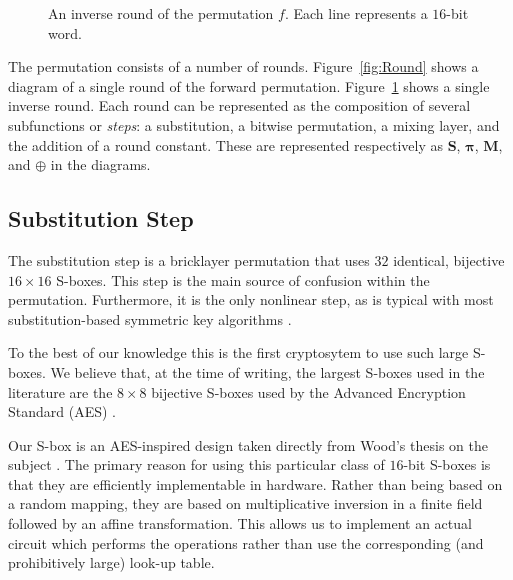 \begin{figure}[p,height=.8\textheight]
\centering

\caption{An inverse round of the permutation $f$. Each line represents a $16$-bit word.}
\label{fig:RoundInverse}
\end{figure}

The permutation consists of a number of rounds.
Figure~\ref{fig:Round} shows a diagram of a single round of the forward permutation.
Figure~\ref{fig:RoundInverse} shows a single inverse round.
Each round can be represented as the composition of several subfunctions or \emph{steps}: a substitution, a bitwise permutation, a mixing layer, and the addition of a round constant.
These are represented respectively as $\mathbf{S}$, $\mathbf{\pi}$, $\mathbf{M}$, and $\oplus$ in the diagrams.

\subsection{Substitution Step}
The substitution step is a bricklayer permutation that uses $32$ identical, bijective $16 \times 16$ S-boxes.
This step is the main source of confusion within the permutation.
Furthermore, it is the only nonlinear step, as is typical with most substitution-based symmetric key algorithms \cite{Stinson2006_CTAP}.

To the best of our knowledge this is the first cryptosytem to use such large S-boxes.
We believe that, at the time of writing, the largest S-boxes used in the literature are the $8 \times 8$ bijective S-boxes used by the Advanced Encryption Standard (AES) \cite{Daemen2002_DesignOfRijndael}\cite{NIST2001_FIPS-197}.

Our S-box is an AES-inspired design taken directly from Wood's thesis on the subject \cite{Wood2013_SboxThesis}.
The primary reason for using this particular class of $16$-bit S-boxes is that they are efficiently implementable in hardware.
Rather than being based on a random mapping, they are based on multiplicative inversion in a finite field followed by an affine transformation.
This allows us to implement an actual circuit which performs the operations rather than use the corresponding (and prohibitively large) look-up table.

